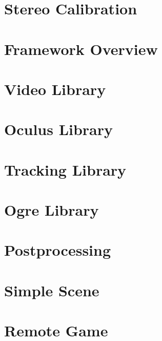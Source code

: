 	\chapter{Stereo Calibration}
	\label{sec:stereo_calibration}
	
	
	\chapter{Framework Overview}
	\label{sec:lib_overview}
	
	
	\chapter{Video Library}
	\label{sec:video_library}
	
	
	\chapter{Oculus Library}
	\label{sec:oculus_library}
	
	
	\chapter{Tracking Library}
	\label{sec:tracking_library}
	
		
	\chapter{Ogre Library}
	\label{sec:ogre_library}
	

	\chapter{Postprocessing}
	\label{sec:postprocessing}
	
	
	\chapter{Simple Scene}
	\label{sec:simple_scene}
	
	
	\chapter{Remote Game}
	\label{sec:remote_game}
	
	
	\newpage

